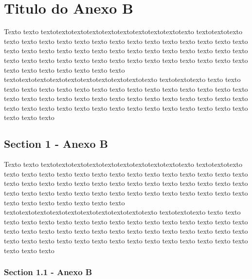 %
%

\chapter{Titulo do Anexo B}\label{apen:annexB}

Texto texto textotextotextotextotextotextotextotextotextotexto textotextotexto texto texto texto texto texto texto texto texto texto texto texto texto texto texto texto texto texto texto texto texto texto texto texto texto texto texto texto texto texto texto texto texto texto texto texto texto texto texto texto texto texto texto texto texto texto texto texto texto texto textotextotextotextotextotextotextotextotextotexto textotextotexto texto texto texto texto texto texto texto texto texto texto texto texto texto texto texto texto texto texto texto texto texto texto texto texto texto texto texto texto texto texto texto texto texto texto texto texto texto texto texto texto texto texto texto texto texto texto texto 

\section{Section 1 - Anexo B}

Texto texto textotextotextotextotextotextotextotextotextotexto textotextotexto texto texto texto texto texto texto texto texto texto texto texto texto texto texto texto texto texto texto texto texto texto texto texto texto texto texto texto texto texto texto texto texto texto texto texto texto texto texto texto texto texto texto texto texto texto texto texto texto texto textotextotextotextotextotextotextotextotextotexto textotextotexto texto texto texto texto texto texto texto texto texto texto texto texto texto texto texto texto texto texto texto texto texto texto texto texto texto texto texto texto texto texto texto texto texto texto texto texto texto texto texto texto texto texto texto texto texto texto texto 

\subsection{Section 1.1 - Anexo B}

